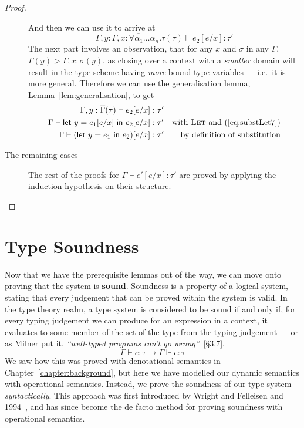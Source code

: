 \begin{proof}
\begin{description}
  And then we can use it to arrive at
  \[ \Gamma , y : \overline{\Gamma, x : \forall\alpha_1\ldots\alpha_n.\tau}(\tau) \vdash e_2 [e/x] : \tau' \]
  The next part involves an observation, that for any $x$ and $\sigma$ in
  any $\Gamma$, ${\overline{\Gamma}(y) > \overline{\Gamma, x : \sigma}(y)}$, as closing
  over a context with a \textit{smaller} domain will result in the
  type scheme having \textit{more} bound type variables --- i.e.\ it is
  more general. Therefore we can use the generalisation lemma,
  Lemma~\ref{lem:generalisation}, to get
  \begin{align*}
    \Gamma , y : \overline{\Gamma}(\tau) \vdash e_2[e/x] : \tau' \\
    \Gamma \vdash \mathsf{let} \ y = e_1[e/x] \ \mathsf{in} \ e_2[e/x] : \tau' && \text{with \textsc{Let}
                                               and
                                               (\ref{eq:substLet7})}
    \\
    \Gamma \vdash (\mathsf{let} \ y = e_1 \ \mathsf{in} \ e_2)[e/x] : \tau' && \text{by definition of substitution}
  \end{align*}
  
  \item[The remaining cases] The rest of the proofs for $\Gamma \vdash e'[e/x] :
    \tau'$ are proved by applying the induction hypothesis on their structure.
  \end{description}
\end{proof}

\section{Type Soundness}

Now that we have the prerequisite lemmas out of the way, we can move
onto proving that the system is \textbf{sound}. Soundness is a
property of a logical system, stating that every judgement that can be
proved within the system is valid. In the type theory realm, a type
system is considered to be sound if and only if, for every typing
judgement we can produce for an expression in a context, it evaluates
to some member of the set of the type from the typing judgement --- or
as Milner put it, \textit{``well-typed programs can't go
  wrong''}~\cite{milner1978}[§3.7].
\[\Gamma \vdash e : \tau \rightarrow \Gamma \Vdash e : \tau\]
We saw how this was proved with denotational semantics in
Chapter~\ref{chapter:background}, but here we have modelled our
dynamic semantics with operational semantics.  Instead, we prove the
soundness of our type system \textit{syntactically}. This approach was
first introduced by Wright and Felleisen and 1994~\cite{wright1994},
and has since become the de facto method for proving soundness
with operational semantics.

